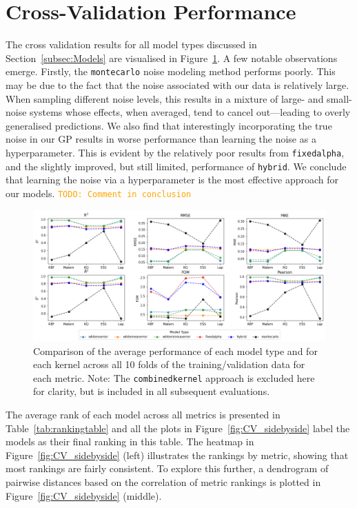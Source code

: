 \documentclass{ucdgradtaughtthesis}
\newcommand{\todo}[1]{\textcolor{orange}{\texttt{TODO: #1}}}
\begin{document}
\section{Cross-Validation Performance}
The cross validation results for all model types discussed in Section~\ref{subsec:Models} are visualised in Figure~\ref{fig:broad_comparison}. A few notable observations emerge. Firstly, the \texttt{montecarlo} noise modeling method performs poorly.
This may be due to the fact that the noise associated with our data is relatively large. When sampling different noise levels, this results in a mixture of large- and small-noise systems whose effects, when averaged, tend to cancel out—leading to overly generalised predictions.
We also find that interestingly incorporating the true noise in our GP results in worse performance than learning the noise as a hyperparameter.
This is evident by the relatively poor results from \texttt{fixedalpha}, and the slightly improved, but still limited, performance of \texttt{hybrid}.
We conclude that learning the noise via a hyperparameter is the most effective approach for our models. \todo{Comment in conclusion}
\begin{figure}[H]
    \centering
    \includegraphics[width=\textwidth]{LatexPlots/CV_plots/metrics_compared.png}
    \caption[Comparing average metrics over all cross validation folds between all model types.]{Comparison of the average performance of each model type and for each kernel across all 10 folds of the training/validation data for each metric. Note: The \texttt{combinedkernel} approach is excluded here for clarity, but is included in all subsequent evaluations.}
    \label{fig:broad_comparison}
\end{figure}
The average rank of each model across all metrics is presented in Table~\ref{tab:rankingtable} and all the plots in Figure~\ref{fig:CV_sidebyside} label the models as their final ranking in this table.
The heatmap in Figure~\ref{fig:CV_sidebyside} (left) illustrates the rankings by metric, showing that most rankings are fairly consistent. To explore this further, a dendrogram of pairwise distances based on the correlation of metric rankings is plotted in Figure~\ref{fig:CV_sidebyside} (middle).
\end{document}
